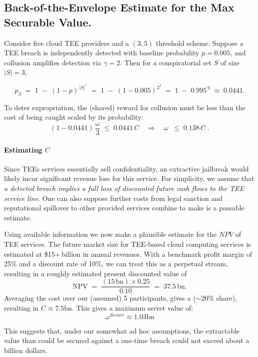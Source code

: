 \documentclass{article}
\begin{document}
\subsection{Back-of-the-Envelope Estimate for the Max Securable Value.}
Consider five cloud TEE providers and a \((3,5)\) threshold scheme.  Suppose a 
TEE breach is independently detected with baseline probability \(p=0.005\), and collusion 
amplifies detection via \(\gamma=2\).  Then for a conspiratorial set \(S\) of size 
\(\lvert S\rvert=3\),

\[
  p_S 
  \;=\;
  1 \;-\;(1 - p)^{\,|S|^\gamma}
  \;=\;
  1 \;-\;
  (1 - 0.005)^{3^2}
  \;=\;
  1 \;-\;
  0.995^{\,9}
  \;\approx\;
  0.0441.
\]

To deter expropriation, the (shared) reward for collusion must be less than the cost of being caught scaled by its probability:
\[
  (1 - 0.0441)\,\frac{\omega}{3}
  \;\le\;
  0.0441\,C
  \quad\Longrightarrow\quad
  \omega 
  \;\;\le\;
  0.138\,C
  \;.
\]

\paragraph{Estimating $C$}
Since TEEs services essentially sell confidentiality, an extractive jailbreak would likely incur significant revenue loss for this service. For simplicity, we assume that \emph{a detected breach implies a full loss of discounted future cash flows to the TEE service line}. One can also suppose further costs from legal sanction and reputational spillover to other provided services combine to make is a passable estimate.

Using available information we now make a plausible estimate for the $NPV$ of TEE services. The future market size for TEE-based cloud computing services is estimated at \$15+\,billion in annual revenues.\citep{grandview-confidential} With a benchmark profit margin of 25\% and a discount rate of 10\%, we can treat this as a perpetual stream, resulting in a roughly estimated present discounted value of
\[
  \text{NPV} \;=\;
  \frac{(15\,\text{bn}) \times 0.25}{0.10}
  \;=\;
  37.5\,\text{bn}.
\]
Averaging the cost over our (assumed) 5 participants, gives a (\(\sim\!\!20\%\) share), resulting in $C \approx 7.5\text{bn}$. This gives a maximum secret value of:
\[
\omega^{Secure} \approx 1.03 \text{bn}
\]

This suggests that, under our somewhat ad hoc assumptions, the extractable value than could be secured against a one-time breach could not exceed about a billion dollars. 

\bigskip




\end{document}
